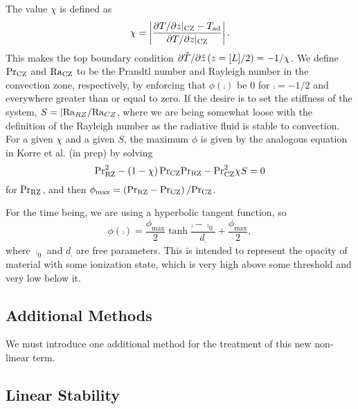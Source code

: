 	The value $\chi$ is defined as
	\begin{equation}
		\chi=\left|\frac{\partial T/\partial z|_{\mathrm{CZ}}-T_{\mathrm{ad}}}{\partial T/\partial z|_{\mathrm{CZ}}}\right|.
	\end{equation}
	This makes the top boundary condition $\partial \hat{T}/\partial \hat{z}\left(z=[L]/2\right)=-1/\chi$.
	We define $\mathrm{Pr}_{\mathrm{CZ}}$ and $\mathrm{Ra}_{\mathrm{CZ}}$ to be the Prandtl number and Rayleigh number in the convection zone, respectively, by enforcing that $\phi\left(\comp\right)$ be $0$ for $\comp=-1/2$ and everywhere greater than or equal to zero.
		If the desire is to set the stiffness of the system, $S=|\mathrm{Ra}_{RZ}/\mathrm{Ra}_{CZ}$, where we are being somewhat loose with the definition of the Rayleigh number as the radiative fluid is stable to convection.
		For a given $\chi$ and a given $S$, the maximum $\phi$ is given by the analogous equation in Korre et al. (in prep) by solving
		\begin{equation}
			\mathrm{Pr}_{\mathrm{RZ}}^{2}-\left(1-\chi\right)\mathrm{Pr}_{\mathrm{CZ}}\mathrm{Pr}_{\mathrm{RZ}}-\mathrm{Pr}_{\mathrm{CZ}}^{2}\chi S=0
		\end{equation}
		for $\mathrm{Pr}_{\mathrm{RZ}}$, and then $\phi_{\mathrm{max}}=\left(\mathrm{Pr}_{\mathrm{RZ}}-\mathrm{Pr}_{\mathrm{CZ}}\right)/\mathrm{Pr}_{\mathrm{CZ}}$.

	For the time being, we are using a hyperbolic tangent function, so
	\begin{equation}
		\phi\left(\comp\right)=\frac{\phi_{\mathrm{max}}}{2}\tanh{\frac{\comp-\comp_{0}}{d_{\comp}}}+\frac{\phi_{\mathrm{max}}}{2},
	\end{equation}
	where $\comp_{0}$ and $d_{\comp}$ are free parameters.
		This is intended to represent the opacity of material with some ionization state, which is very high above some threshold and very low below it.


\subsection{Additional Methods} %
\label{sub:additional_methods}

	We must introduce one additional method for the treatment of this new non-linear term.


\subsection{Linear Stability} %
\label{sub:linear_stability}

